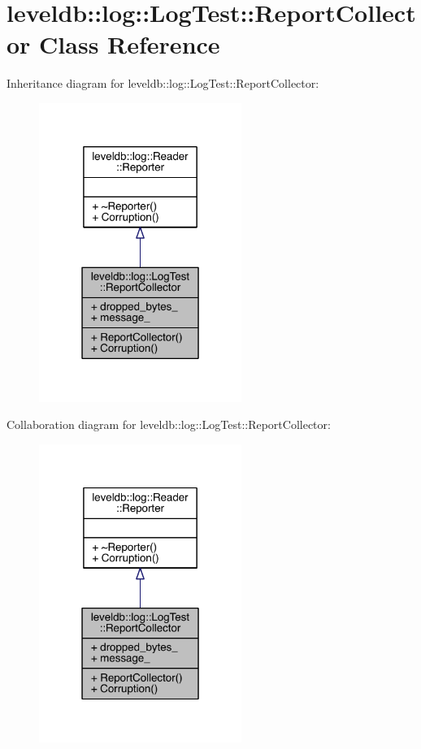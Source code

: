 \hypertarget{classleveldb_1_1log_1_1_log_test_1_1_report_collector}{}\section{leveldb\+:\+:log\+:\+:Log\+Test\+:\+:Report\+Collector Class Reference}
\label{classleveldb_1_1log_1_1_log_test_1_1_report_collector}


Inheritance diagram for leveldb\+:\+:log\+:\+:Log\+Test\+:\+:Report\+Collector\+:\nopagebreak
\begin{figure}[H]
\begin{center}
\leavevmode
\includegraphics[width=187pt]{classleveldb_1_1log_1_1_log_test_1_1_report_collector__inherit__graph}
\end{center}
\end{figure}


Collaboration diagram for leveldb\+:\+:log\+:\+:Log\+Test\+:\+:Report\+Collector\+:\nopagebreak
\begin{figure}[H]
\begin{center}
\leavevmode
\includegraphics[width=187pt]{classleveldb_1_1log_1_1_log_test_1_1_report_collector__coll__graph}
\end{center}
\end{figure}
